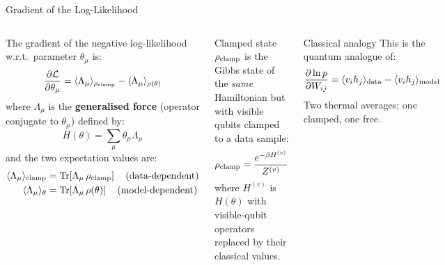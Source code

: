 \documentclass[aspectratio=169,10pt]{beamer}
\begin{document}
\begin{frame}{Gradient of the Log-Likelihood}
  \begin{columns}[T]
      The gradient of the negative log-likelihood w.r.t.\
      parameter $\theta_\mu$ is:
      \[
        \frac{\partial\mathcal{L}}{\partial\theta_\mu}
        = \langle\Lambda_\mu\rangle_{\rho_{\rm clamp}}
          - \langle\Lambda_\mu\rangle_{\rho(\theta)}
      \]
      where $\Lambda_\mu$ is the \textbf{generalised force}
      (operator conjugate to $\theta_\mu$) defined by:
      \[
        H(\theta) = \sum_\mu \theta_\mu \Lambda_\mu
      \]
      and the two expectation values are:
      \begin{align*}
        \langle\Lambda_\mu\rangle_{\rm clamp}
        &= \Tr\!\left[\Lambda_\mu\,\rho_{\rm clamp}\right]
           \quad\text{(data-dependent)}\\
        \langle\Lambda_\mu\rangle_\theta
        &= \Tr\!\left[\Lambda_\mu\,\rho(\theta)\right]
           \quad\text{(model-dependent)}
      \end{align*}
      \begin{block}{Clamped state}
        $\rho_{\rm clamp}$ is the Gibbs state of the \emph{same}
        Hamiltonian but with visible qubits clamped to a data sample:
        \[
          \rho_{\rm clamp}
          = \frac{e^{-\beta H^{(v)}}}{Z^{(v)}}
        \]
        where $H^{(v)}$ is $H(\theta)$ with visible-qubit
        operators replaced by their classical values.
      \end{block}
      \vspace{0.2cm}
      \begin{alertblock}{Classical analogy}
        This is the quantum analogue of:
        \[
          \frac{\partial\ln p}{\partial W_{ij}}
          = \langle v_ih_j\rangle_{\rm data}
          - \langle v_ih_j\rangle_{\rm model}
        \]
        Two thermal averages; one clamped, one free.
      \end{alertblock}
  \end{columns}
\end{frame}
\end{document}
